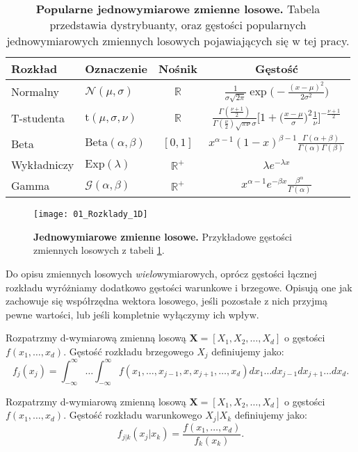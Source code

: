 \begin{table}[h]
	\caption{\textbf{Popularne jednowymiarowe zmienne losowe.} Tabela przedstawia dystrybuanty, oraz gęstości popularnych jednowymiarowych zmiennych losowych pojawiających się w tej pracy.}
	\label{tab:przykladowe_zmienne_losowe}
	\centering
	\begin{tabular}{ll|c|c}
		\hline
		\textbf{Rozkład} & \textbf{Oznaczenie} & \textbf{Nośnik} & \textbf{Gęstość} \\
		\hline
		Normalny & $\mathcal{N}(\mu, \sigma)$ & $\mathbb{R}$ & $\frac{1}{\sigma \sqrt{2 \pi}} \exp\big(-\frac{(x-\mu)^2}{2\sigma^2}\big)$\\ 
		T-studenta & $\text{t}(\mu, \sigma, \nu)$ & $\mathbb{R}$ & $ \frac{\Gamma(\frac{\nu + 1}{2})}{\Gamma(\frac{\nu}{2})\sqrt{\pi\nu}\sigma} \bigg[1 + \big(\frac{x - \mu}{\sigma}\big)^2\frac{1}{\nu}\bigg]^{-\frac{\nu + 1}{2}} $ \\ 
		Beta & $\text{Beta}(\alpha, \beta)$ & $[0, 1]$ & $ x^{\alpha - 1}(1 - x)^{\beta - 1}\frac{\Gamma(\alpha + \beta)}{\Gamma(\alpha)\Gamma(\beta)}$ \\ 
		Wykładniczy & $\text{Exp}(\lambda)$ & $\mathbb{R}^{+}$ & $ \lambda e^{-\lambda x}$ \\
		Gamma & $\mathcal{G}(\alpha, \beta)$ & $\mathbb{R}^+$ & $x^{\alpha - 1}e^{-\beta x}\frac{\beta^\alpha}{\Gamma(\alpha)}$\\ 
		
		\hline
	\end{tabular}
\end{table}

\begin{figure}[H]
	\centering
	\texttt{[image: 01\_Rozklady\_1D]}
	\caption{\textbf{Jednowymiarowe zmienne losowe.} Przykładowe gęstości zmiennych losowych z tabeli \ref{tab:przykladowe_zmienne_losowe}.\label{fig:przykladowe_zmienne_losowe}}
\end{figure}

Do opisu zmiennych losowych \emph{wielo}wymiarowych, oprócz gęstości łącznej rozkładu wyróżniamy dodatkowo gęstości warunkowe i brzegowe. Opisują one jak zachowuje się współrzędna wektora losowego, jeśli pozostałe z nich przyjmą pewne wartości, lub jeśli kompletnie wyłączymy ich wpływ.

\begin{df}
	Rozpatrzmy d-wymiarową zmienną losową $\mathbf{X} = [X_1, X_2, \dots, X_d]$ o gęstości $f(x_1, \dots, x_d)$. Gęstość rozkładu brzegowego $X_j$ definiujemy jako:
	$$f_j(x_j)=\int_{-\infty}^{\infty}\dots\int_{-\infty}^{\infty} f(x_1, \dots, x_{j-1}, x, x_{j+1}, \dots, x_d)  dx_1\dots dx_{j-1} dx_{j+1} \dots dx_d.$$
\end{df}

\begin{df}
	Rozpatrzmy d-wymiarową zmienną losową $\mathbf{X} = [X_1, X_2, \dots, X_d]$ o gęstości $f(x_1, \dots, x_d)$. Gęstość rozkładu warunkowego $X_j \vert X_k$ definiujemy jako:
	$$f_{j|k}(x_j|x_k) = \frac{f(x_1, \dots, x_d)}{f_k(x_k)}.$$
\end{df}
